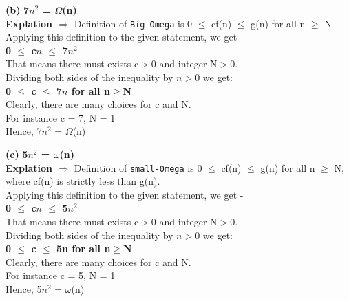 \documentclass[12pt]{article}
\renewcommand\part[1]{\vspace{.10in}\textbf{(#1)}}
\begin{document}

\part{b} \textbf{7$n^2$ = $\Omega$(n)}
\\
\textbf{Explation $\Rightarrow$} Definition of \texttt{Big-Omega} is 0 $\leq$ cf(n) $\leq$ g(n) for all n $\geq$ N 
\\
Applying this definition to the given statement,  we get -
\\
\hspace{3cm}\textbf{0 $\leq$ c$n$ $\leq$ 7$n^2$} 
\\
That means there must exists c$>$0	and	integer	N$>$0.
\\Dividing both sides of the inequality by	$n$$>$0 we get:
\\ \hspace{3cm}\textbf{0 $\leq$ c $\leq$ 7$n$ for all n$\geq$N}
\\ Clearly, there are many choices for c and N. 
\\ For instance c = 7, N = 1
\\ Hence, 7$n^2$ = $\Omega$(n)

\part{c} \textbf{5$n^2$ = $\omega$(n)}
\\
\textbf{Explation $\Rightarrow$} Definition of \texttt{small-0mega} is 0 $\leq$ cf(n) $\leq$ g(n) for all n $\geq$ N, where cf(n) is strictly less than g(n). 
\\
Applying this definition to the given statement,  we get -
\\
\hspace{3cm}\textbf{0 $\leq$ c$n$ $\leq$ 5$n^2$} 
\\
That means there must exists c$>$0	and	integer	N$>$0.
\\Dividing both sides of the inequality by	$n$$>$0 we get:
\\ \hspace{3cm}\textbf{0 $\leq$ c $\leq$ 5n for all n$\geq$N}
\\ Clearly, there are many choices for c and N. 
\\ For instance c = 5, N = 1
\\ Hence, 5$n^2$ = $\omega$(n)
\end{document}
